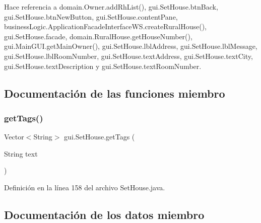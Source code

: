 Hace referencia a domain.\+Owner.\+add\+Rh\+List(), gui.\+Set\+House.\+btn\+Back, gui.\+Set\+House.\+btn\+New\+Button, gui.\+Set\+House.\+content\+Pane, business\+Logic.\+Application\+Facade\+Interface\+W\+S.\+create\+Rural\+House(), gui.\+Set\+House.\+facade, domain.\+Rural\+House.\+get\+House\+Number(), gui.\+Main\+G\+U\+I.\+get\+Main\+Owner(), gui.\+Set\+House.\+lbl\+Address, gui.\+Set\+House.\+lbl\+Message, gui.\+Set\+House.\+lbl\+Room\+Number, gui.\+Set\+House.\+text\+Address, gui.\+Set\+House.\+text\+City, gui.\+Set\+House.\+text\+Description y gui.\+Set\+House.\+text\+Room\+Number.



\subsection{Documentación de las funciones miembro}
\mbox{\label{classgui_1_1_set_house_ab46856159d04bd7c4f843417413107f3}} 
\subsubsection{\texorpdfstring{getTags()}{getTags()}}
{\footnotesize\ttfamily Vector$<$String$>$ gui.\+Set\+House.\+get\+Tags (\begin{DoxyParamCaption}\item[{String}]{text }\end{DoxyParamCaption})}



Definición en la línea 158 del archivo Set\+House.\+java.


\begin{DoxyCode}{0}

\end{DoxyCode}


\subsection{Documentación de los datos miembro}
\mbox{\label{classgui_1_1_set_house_a13f738cdb6c7310f7001d6799d7a6065}} 
